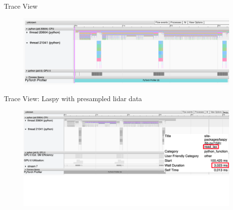\documentclass[compress,aspectratio=169]{beamer}
\begin{document}
\begin{frame}{Trace View}
    \vspace{-1em}
\begin{center}
    \begin{figure}
        \includegraphics[width=1\textwidth]{../../data/scap_gtx1080_profiler-torch_batch-size-64_14650758_trace-view}
    \end{figure}
    \end{center}
\end{frame}

\begin{frame}{Trace View: Laspy with presampled lidar data}
    \vspace{-1em}
\begin{center}
    \begin{figure}
        \includegraphics[width=1\textwidth]{../../data/scap_gtx1080_profiler-torch_batch-size-64_14650758_trace-view-laspy}
    \end{figure}
    \end{center}
\end{frame}
\end{document}
